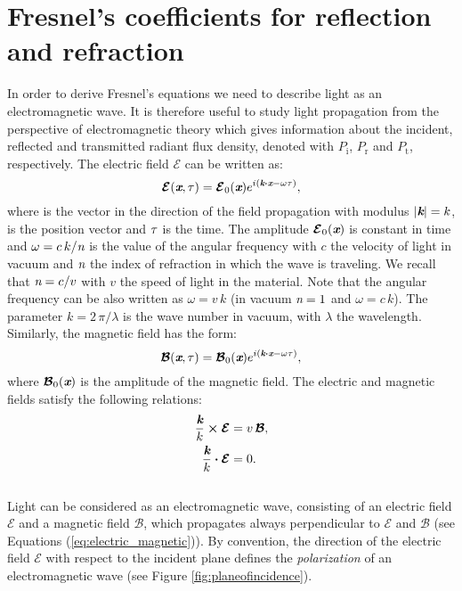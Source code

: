 \section{Fresnel's coefficients for reflection and refraction}\label{sec:fresnel}
In order to derive Fresnel's equations we need to describe light as an electromagnetic wave. 
It is therefore useful to study light propagation from the perspective of electromagnetic theory which gives information about the incident, reflected and transmitted radiant flux density, denoted with $P_\textrm{i}$, $P_\textrm{r}$ and $P_\textrm{t}$, respectively.  
The electric field $\boldsymbol{\mathcal{E}}$ can be written as: 
\begin{equation}
\boldsymbol{\mathcal{E}}(\textit{\textbf{x}}, \tau) = \boldsymbol{\mathcal{E}}_0(\textit{\textbf{x}} )e^{i( \textit{\textbf{k}}\boldsymbol{\cdot}\textit{\textbf{x}}-\omega \tau)},
\end{equation}
where  is the vector in the direction of the field propagation with modulus 
$|\textit{\textbf{k}}| = k$,  is the position vector and $\tau$ is the time. The amplitude $\boldsymbol{\mathcal{E}}_0(\textit{\textbf{x}})$ is constant in time and $\omega = c\,k/ \textit{n}$ is the value of the angular frequency with $c$ the velocity of light in vacuum and $\textit{n}$ the index of refraction in which the wave is traveling. We recall that $\textit{n} = c/v$ with $v$ the speed of light in the material. Note that the angular frequency can be also written as $\omega = v\,k$ (in vacuum $\textit{n}=1$ and $\omega=c\,k$). The parameter
$k =2\,\pi/\lambda$ is the wave number in vacuum, with $\lambda$ the wavelength. \\ \indent Similarly, the magnetic field has the form:
\begin{equation}
\boldsymbol{\mathcal{B}}(\textit{\textbf{x}}, \tau) = \boldsymbol{\mathcal{B}}_0(\textit{\textbf{x}}) e^{i( \textit{\textbf{k}}\boldsymbol{\cdot} \textit{\textbf{x}}-\omega \tau )},
\end{equation}
where $\boldsymbol{\mathcal{B}}_0(\textit{\textbf{x}})$ is the amplitude of the magnetic field.
The electric and magnetic fields satisfy the following relations:
\begin{subequations}\label{eq:electric_magnetic}
\begin{align}
\frac{\textit{\textbf{k}}}{k} \boldsymbol{\times} \boldsymbol{\mathcal{E}} & = v \, \boldsymbol{\mathcal{B}}, \\
\frac{\textit{\textbf{k}}}{k} \boldsymbol{\cdot}\boldsymbol{\mathcal{E}} &=0.
\end{align}
\end{subequations}
\\ \indent Light can be considered as an electromagnetic wave, consisting of an electric field $\boldsymbol{\mathcal{E}}$ and a magnetic field $\boldsymbol{\mathcal{B}}$, which propagates always perpendicular to $\boldsymbol{\mathcal{E}}$ and $\boldsymbol{\mathcal{B}}$ (see Equations (\ref{eq:electric_magnetic})). By convention, the direction of the electric field $\boldsymbol{\mathcal{E}}$ with respect to the incident plane defines the \textit{polarization} of an electromagnetic wave \cite{feynman1964feynman} (see Figure \ref{fig:planeofincidence}). \\
